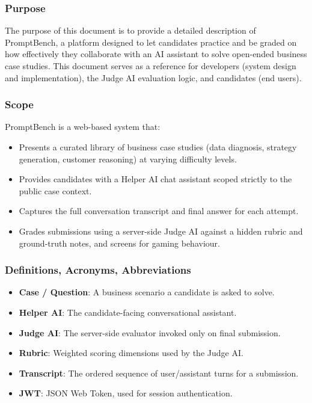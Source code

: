 \documentclass[12pt,a4paper]{report}
\begin{document}
\subsubsection{Purpose}
The purpose of this document is to provide a detailed description of PromptBench, a platform
designed to let candidates practice and be graded on how effectively they collaborate with an AI
assistant to solve open-ended business case studies. This document serves as a reference for
developers (system design and implementation), the Judge AI evaluation logic, and candidates
(end users).

\subsubsection{Scope}
PromptBench is a web-based system that:
\begin{itemize}[nosep]
    \item Presents a curated library of business case studies (data diagnosis, strategy
    generation, customer reasoning) at varying difficulty levels.
    \item Provides candidates with a Helper AI chat assistant scoped strictly to the public case
    context.
    \item Captures the full conversation transcript and final answer for each attempt.
    \item Grades submissions using a server-side Judge AI against a hidden rubric and ground-truth
    notes, and screens for gaming behaviour.
\end{itemize}

\subsubsection{Definitions, Acronyms, Abbreviations}
\begin{itemize}[nosep]
    \item \textbf{Case / Question}: A business scenario a candidate is asked to solve.
    \item \textbf{Helper AI}: The candidate-facing conversational assistant.
    \item \textbf{Judge AI}: The server-side evaluator invoked only on final submission.
    \item \textbf{Rubric}: Weighted scoring dimensions used by the Judge AI.
    \item \textbf{Transcript}: The ordered sequence of user/assistant turns for a submission.
    \item \textbf{JWT}: JSON Web Token, used for session authentication.
\end{itemize}
\end{document}
